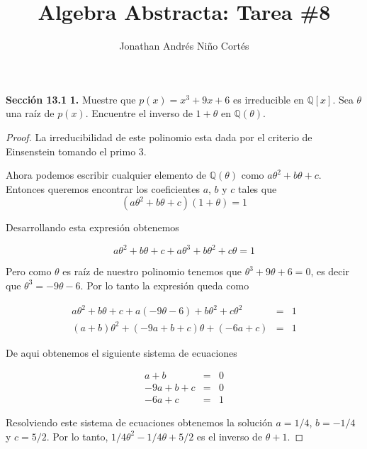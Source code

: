 \documentclass[letter,twoside,12pt]{article}
\title{Algebra Abstracta: Tarea \#8}
\author{Jonathan Andrés Niño Cortés}
\begin{document}
\maketitle
\textbf{Sección 13.1} \textbf{1.} Muestre que $ p(x) = x^3+9x+6 $ es irreducible en $ \mathbb{Q}[x] $. Sea $ \theta $ una raíz de $ p(x) $. Encuentre el inverso de $ 1 + \theta $ en $ \mathbb{Q}(\theta) $.

\begin{proof}
La irreducibilidad de este polinomio esta dada por el criterio de Einsenstein tomando el primo 3.

Ahora podemos escribir cualquier elemento de $ \mathbb{Q}(\theta) $ como $ a\theta^{2}+b\theta +c $. Entonces queremos encontrar los coeficientes $ a $, $ b $ y $ c $ tales que
\begin{equation}
(a\theta^{2}+b\theta +c)(1+\theta) = 1 \nonumber
\end{equation}

Desarrollando esta expresión obtenemos

\begin{equation}
a\theta^{2}+b\theta +c + a\theta^{3}+b\theta^{2} +c\theta = 1 \nonumber
\end{equation}

Pero como $ \theta $ es raíz de nuestro polinomio tenemos que $ \theta^3+9\theta+6= 0 $, es decir que $ \theta^{3}=-9\theta-6 $. Por lo tanto la expresión queda como

\begin{eqnarray}
a\theta^{2}+b\theta +c + a(-9\theta-6)+b\theta^{2} +c\theta ^2&=& 1 \nonumber
\\ (a+b)\theta^2 + (-9a+b+c)\theta +(-6a+c) &=& 1 \nonumber 
\end{eqnarray}

De aqui obtenemos el siguiente sistema de ecuaciones

\begin{eqnarray}
a+b &=&0 \nonumber
\\-9a+b+c&=&0 \nonumber
\\-6a+c&=&1 \nonumber
\end{eqnarray}

Resolviendo este sistema de ecuaciones obtenemos la solución $ a=1/4 $, $ b=-1/4 $ y $ c=5/2 $. Por lo tanto, $ 1/4\theta^2-1/4\theta+5/2 $ es el inverso de $ \theta+1 $.
\end{proof}
\end{document}
